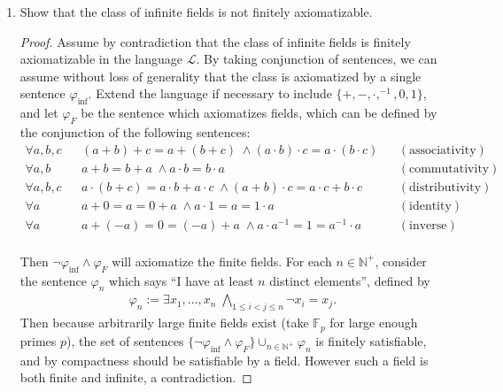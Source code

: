\documentclass{article}
\begin{document}
\begin{enumerate}
\begin{proof}
      $\Leftarrow$: Let $\mathcal{M}\models\text{Th}(\mathcal{K})$. We
      first show that given any finite theory $T_0$, if $\mathcal{M}\models
      T_0$, then $\mathcal{N}\models T_0$ for some
      $\mathcal{N}\in\mathcal{K}$: Let $\varphi_0$ be the conjunction of
      the sentences in $T_0$. If no model in $\mathcal{K}$ satisfies
      $\varphi_0$, then all models in $\mathcal{K}$ will satisfy
      $\neg\varphi_0$, and so $\neg\varphi_0\in\text{Th}(\mathcal{K})$,
      which implies that $\mathcal{M}\models\neg\varphi_0$, a
      contradiction. \\
    \end{proof}

  \item Show that the class of infinite fields is not finitely
    axiomatizable.
    \begin{proof}
      Assume by contradiction that the class of infinite fields is finitely
      axiomatizable in the language $\mathcal{L}$. By taking conjunction of
      sentences, we can assume without loss of generality that the class is
      axiomatized by a single sentence $\varphi_{\text{inf}}$. Extend the
      language if necessary to include $\{+,-,\cdot,^{-1},0,1\}$, and let
      $\varphi_F$ be the sentence which axiomatizes fields, which can be
      defined by the conjunction of the following sentences:
      \begin{align*}
        \forall a,b,c && (a+b)+c=a+(b+c)\; \wedge (a\cdot b)\cdot
          c=a\cdot(b\cdot c)  && (\text{associativity}) \\
        \forall a,b   && a+b=b+a\; \wedge a\cdot b=b\cdot a  &&
          (\text{commutativity}) \\
        \forall a,b,c && a\cdot(b+c)=a\cdot b+a\cdot c\; \wedge (a+b)\cdot
          c=a\cdot c+b\cdot c  && (\text{distributivity}) \\
        \forall a     && a+0=a=0+a\; \wedge a\cdot1=a=1\cdot a  &&
          (\text{identity}) \\
        \forall a     && a+(-a)=0=(-a)+a\; \wedge a\cdot
          a^{-1}=1=a^{-1}\cdot a  && (\text{inverse}) \\
      \end{align*}

      Then $\neg\varphi_{\text{inf}}\wedge\varphi_F$ will axiomatize the
      finite fields. For each $n\in\mathbb{N}^+$, consider the sentence
      $\varphi_n$ which says ``I have at least $n$ distinct elements'',
      defined by
      \begin{align*}
        \varphi_n := \exists x_1,\ldots,x_n\; \bigwedge_{1\leq i<j\leq n}
        \neg x_i=x_j.
      \end{align*}
      Then because arbitrarily large finite fields exist (take
      $\mathbb{F}_p$ for large enough primes $p$), the set of sentences
      $\{\neg\varphi_{\text{inf}}\wedge\varphi_F\}\cup_{n\in\mathbb{N}^+}\varphi_n$
      is finitely satisfiable, and by compactness should be satisfiable by
      a field. However such a field is both finite and infinite, a
      contradiction.
    \end{proof}


\end{enumerate}
\end{document}
